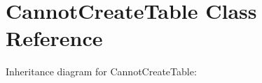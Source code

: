 \hypertarget{classCannotCreateTable}{}\section{Cannot\+Create\+Table Class Reference}
\label{classCannotCreateTable}


Inheritance diagram for Cannot\+Create\+Table\+:

